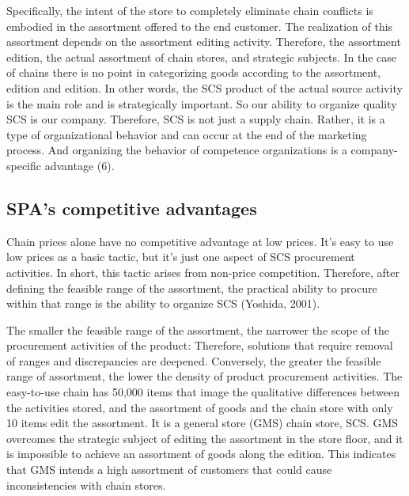\documentclass[]{article}
\begin{document}
Specifically, the intent of the store to completely eliminate chain
conflicts is embodied in the assortment offered to the end customer. The
realization of this assortment depends on the assortment editing
activity. Therefore, the assortment edition, the actual assortment of
chain stores, and strategic subjects. In the case of chains there is no
point in categorizing goods according to the assortment, edition and
edition. In other words, the SCS product of the actual source activity
is the main role and is strategically important. So our ability to
organize quality SCS is our company. Therefore, SCS is not just a supply
chain. Rather, it is a type of organizational behavior and can occur at
the end of the marketing process. And organizing the behavior of
competence organizations is a company-specific advantage (6).

\hypertarget{spas-competitive-advantages}{%
\subsection{SPA's competitive
advantages}\label{spas-competitive-advantages}}

Chain prices alone have no competitive advantage at low prices. It's
easy to use low prices as a basic tactic, but it's just one aspect of
SCS procurement activities. In short, this tactic arises from non-price
competition. Therefore, after defining the feasible range of the
assortment, the practical ability to procure within that range is the
ability to organize SCS (Yoshida, 2001).

The smaller the feasible range of the assortment, the narrower the scope
of the procurement activities of the product: Therefore, solutions that
require removal of ranges and discrepancies are deepened. Conversely,
the greater the feasible range of assortment, the lower the density of
product procurement activities. The easy-to-use chain has 50,000 items
that image the qualitative differences between the activities stored,
and the assortment of goods and the chain store with only 10 items edit
the assortment. It is a general store (GMS) chain store, SCS. GMS
overcomes the strategic subject of editing the assortment in the store
floor, and it is impossible to achieve an assortment of goods along the
edition. This indicates that GMS intends a high assortment of customers
that could cause inconsistencies with chain stores.
\end{document}
